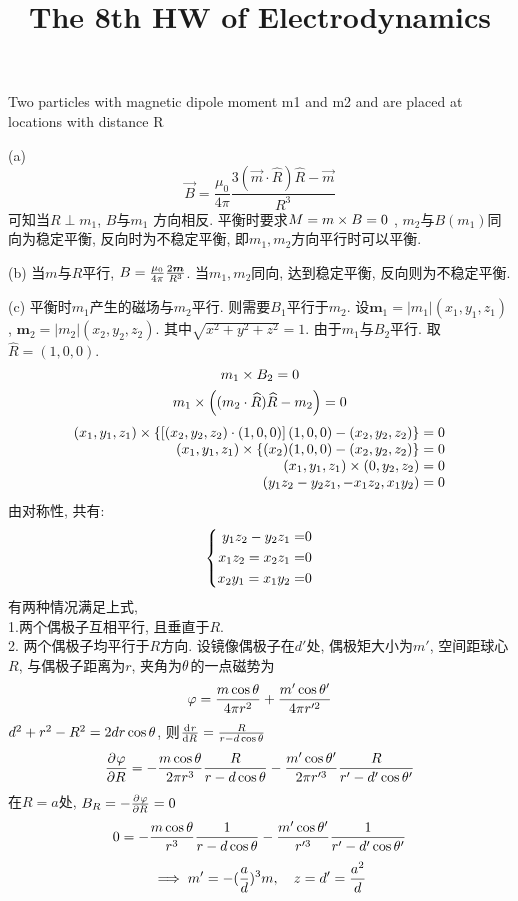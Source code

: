 \documentclass[UTF8,9pt]{ctexart}
\title{The 8th HW of Electrodynamics}
\begin{document}
 
\maketitle
{}
Two particles with magnetic dipole moment m1 and m2 and are placed at locations with distance R

(a)
$$ 
\vec{B}=\frac{\mu_{0}}{4 \pi} \frac{3(\vec{m} \cdot \hat{R}) \hat{R}-\vec{m}}{R^{3}}
 $$
可知当$R\perp m_1$, $B$与$m_1$ 方向相反. 平衡时要求$M=m \times B=0$ , $m_2$与$B(m_1)$同向为稳定平衡, 反向时为不稳定平衡, 即$m_1, m_2$方向平行时可以平衡. 

(b)
当$m$与$R$平行, $B=\frac{\mu_{0}}{4 \pi} \frac{2\bm{m}}{R^3}$. 当$m_1,m_2$同向, 达到稳定平衡, 反向则为不稳定平衡. 

(c)
平衡时$m_1$产生的磁场与$m_2$平行. 则需要$B_1$平行于$m_2$. 设$\bm{m}_1 = |m_1|(x_1,y_1,z_1)$, $\bm{m}_2 = |m_2|(x_2,y_2,z_2)$. 其中$\sqrt{x^2+y^2+z^2}=1$.
由于$m_1$与$B_2$平行. 取$\hat{R} = (1,0,0)$.
$$m_1\times B_2 = 0$$
$$m_1\times\left(  (m_2\cdot \widehat{R})\widehat{R} - m_2  \right)= 0$$
$$\begin{array}{rl}
    (x_1,y_1,z_1) \times\{[ (x_2,y_2,z_2)\cdot(1,0,0)]\, (1,0,0) - (x_2,y_2,z_2) \} =0\\
    (x_1,y_1,z_1) \times\{(x_2) (1,0,0) - (x_2,y_2,z_2)\}=0\\
    (x_1,y_1,z_1) \times (0,y_2,z_2)=0\\
    (y_1z_2-y_2z_1,-x_1z_2,x_1y_2)=0
\end{array}$$
由对称性, 共有:
$$\left\{\begin{aligned} 
    y_1z_2 - y_2z_1 =& 0\\
    x_1z_2 = x_2z_1 =& 0\\
    x_2y_1 = x_1y_2 =& 0
 \end{aligned}\right.$$
有两种情况满足上式, \\
1.两个偶极子互相平行, 且垂直于$R$. \\
2. 两个偶极子均平行于$R$方向.  
设镜像偶极子在$d'$处, 偶极矩大小为$m'$, 空间距球心$R$, 与偶极子距离为$r$, 夹角为$\theta$的一点磁势为
$$ 
\varphi=\frac{m\cos\theta}{4 \pi r^2}+\frac{m'\cos\theta'}{4 \pi r'^2}
 $$
 $d^2+r^2-R^2=2dr\cos\theta$, 则$\frac{\mathrm{d}^{} r}{\mathrm{d} {R}^{}} = \frac{R}{r-d\cos\theta}$
$$\frac{\partial^{} \varphi}{\partial {R}^{}} = -\frac{m\cos\theta}{2\pi r^3}\frac{R}{r-d\cos\theta}-\frac{m'\cos\theta'}{2\pi r'^3}\frac{R}{r'-d'\cos\theta'}$$
在$R=a$处, $B_R=-\frac{\partial^{} \varphi}{\partial {R}^{}}=0$
$$0 = -\frac{m\cos\theta}{r^3}\frac{1}{r-d\cos\theta}-\frac{m'\cos\theta'}{r'^3}\frac{1}{r'-d'\cos\theta'}$$
$$\implies m'=-(\frac{a}{d})^3m,\quad z=d'=\frac{a^2}{d}$$
\end{document}
